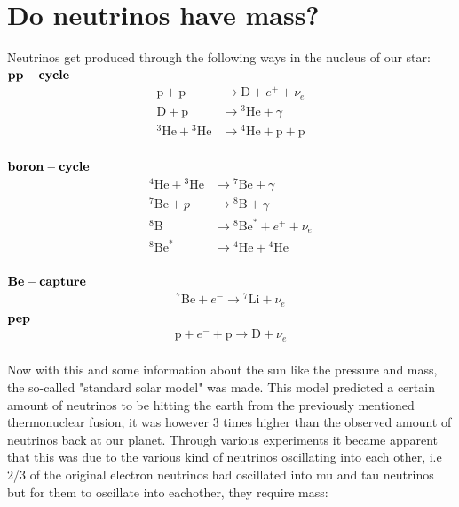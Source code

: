 \documentclass[11pt,a4paper,faculty=we,language=en,doctype=report]{cls/ugent-doc}
\begin{document}
\section{Do neutrinos have mass?}
Neutrinos get produced through the following ways in the nucleus of our star:\\
$\bold{pp-cycle}$
\begin{align}
	\mathrm{p} + \mathrm{p} &\rightarrow \mathrm{D} + e^+ + \nu_e\\
	\mathrm{D} + \mathrm{p} &\rightarrow {}^3\mathrm{He} + \gamma\\
	{}^3\mathrm{He} + {}^3\mathrm{He} &\rightarrow {}^4\mathrm{He} + \mathrm{p} + \mathrm{p}
\end{align}\\
$\bold{boron-cycle}$
\begin{align}
{ }^4 \mathrm{He}+{ }^3 \mathrm{He} & \rightarrow{ }^7 \mathrm{Be}+\gamma \\
{ }^7 \mathrm{Be}+p & \rightarrow { }^8\mathrm{B} + \gamma \\
{ }^8 \mathrm{B} & \rightarrow{ }^8 \mathrm{Be}^*+e^{+}+\nu_e \\
{ }^8 \mathrm{Be}^* & \rightarrow{ }^4 \mathrm{He}+{ }^4 \mathrm{He}
\end{align}\\
$\bold{Be-capture}$
\begin{align}
	^7\mathrm{Be} + e^- \rightarrow {}^7\mathrm{Li} + \nu_e
\end{align}
$\bold{pep}$
\begin{align}
	\mathrm{p} + e^- + \mathrm{p} \rightarrow \mathrm{D} + \nu_e
\end{align}\\
Now with this and some information about the sun like the pressure and mass, 
the so-called "standard solar model" was
made. This model predicted a certain amount of neutrinos to be hitting the earth from the previously
mentioned thermonuclear fusion, it was however 3 times higher than the observed amount of neutrinos back
at our planet. Through various experiments it became apparent that this was due to the various kind of
neutrinos oscillating into each other, i.e 2/3 of the original electron 
neutrinos had oscillated into mu and tau neutrinos
but for them to oscillate into eachother, they require mass:
\end{document}
